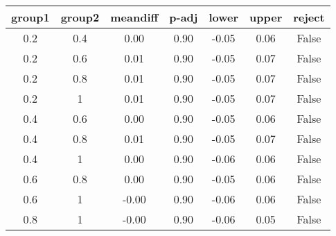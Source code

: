\begin{tabular}{|c|c|c|c|c|c|c|}
\toprule
group1 & group2 &  meandiff &  p-adj &  lower &  upper &  reject \\
\midrule
   0.2 &    0.4 &      0.00 &   0.90 &  -0.05 &   0.06 &   False \\
   0.2 &    0.6 &      0.01 &   0.90 &  -0.05 &   0.07 &   False \\
   0.2 &    0.8 &      0.01 &   0.90 &  -0.05 &   0.07 &   False \\
   0.2 &      1 &      0.01 &   0.90 &  -0.05 &   0.07 &   False \\
   0.4 &    0.6 &      0.00 &   0.90 &  -0.05 &   0.06 &   False \\
   0.4 &    0.8 &      0.01 &   0.90 &  -0.05 &   0.07 &   False \\
   0.4 &      1 &      0.00 &   0.90 &  -0.06 &   0.06 &   False \\
   0.6 &    0.8 &      0.00 &   0.90 &  -0.05 &   0.06 &   False \\
   0.6 &      1 &     -0.00 &   0.90 &  -0.06 &   0.06 &   False \\
   0.8 &      1 &     -0.00 &   0.90 &  -0.06 &   0.05 &   False \\
\bottomrule
\end{tabular}
